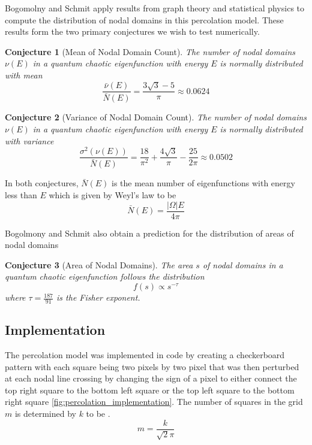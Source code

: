 \documentclass{report}
\begin{document}
Bogomolny and Schmit apply results from graph theory and statistical physics to compute the distribution of nodal domains in this percolation model. These results form the two primary conjectures we wish to test numerically.

\newtheorem{conj}{Conjecture}
\begin{conj}[Mean of Nodal Domain Count]
  \label{conj:mean_prediction}
  The number of nodal domains $\nu(E)$ in a quantum chaotic eigenfunction with energy $E$ is normally distributed with mean
  \begin{equation}
    \frac{\bar{\nu}(E)}{\bar{N}(E)} = \frac{3 \sqrt{3} - 5}{\pi} \approx 0.0624
  \end{equation}
\end{conj}

\begin{conj}[Variance of Nodal Domain Count]
  \label{conj:variance_prediction}
  The number of nodal domains $\nu(E)$ in a quantum chaotic eigenfunction with energy $E$ is normally distributed with variance
  \begin{equation}
    \frac{\sigma^{2}(\nu(E))}{\bar{N}(E)} = \frac{18}{\pi^{2}} + \frac{4 \sqrt{3}}{\pi} - \frac{25}{2 \pi} \approx 0.0502
  \end{equation}
\end{conj}  

In both conjectures, $\bar{N}(E)$ is the mean number of eigenfunctions with energy less than $E$ which is given by Weyl's law \cite{garabedian} to be
\[
\bar{N}(E) = \frac{\vert \Omega \vert E}{4 \pi}
\]

Bogolmony and Schmit also obtain a prediction for the distribution of areas of nodal domains

\begin{conj}[Area of Nodal Domains]
  \label{conj:area_prediction}
  The area $s$ of nodal domains in a quantum chaotic eigenfunction follows the distribution
  \begin{equation}
    f(s) \propto s^{-\tau}
  \end{equation}
  where $\tau = \frac{187}{91}$ is the Fisher exponent.
\end{conj}

\subsection{Implementation}
The percolation model was implemented in code by creating a checkerboard pattern with each square being two pixels by two pixel that was then perturbed at each nodal line crossing by changing the sign of a pixel to either connect the top right square to the bottom left square or the top left square to the bottom right square \ref{fig:percolation_implementation}. The number of squares in the grid $m$ is determined by $k$ to be \cite{bogomolny}.
\[
m = \frac{k}{\sqrt{2}\pi}
\]
\end{document}
